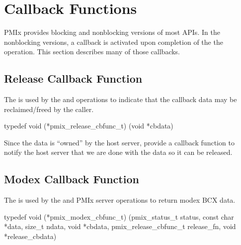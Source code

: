 %


\section{Callback Functions}

PMIx provides blocking and nonblocking versions of most APIs.
In the nonblocking versions, a callback is activated upon completion of the the operation.
This section describes many of those callbacks.


\subsection{Release Callback Function}

\summary

The  is used by the  and  operations to indicate that the callback data may be reclaimed/freed by the caller.

\format

\cspecificstart
\begin{codepar}
typedef void (*pmix_release_cbfunc_t)
    (void *cbdata)
\end{codepar}
\cspecificend

\begin{arglist}
\end{arglist}

\descr

Since the data is ``owned'' by the host server, provide a callback function to notify the host server that we are done with the data so it can be released.


\subsection{Modex Callback Function}

\summary

The  is used by the  and  PMIx server operations to return modex \ac{BCX} data.

\cspecificstart
\begin{codepar}
typedef void (*pmix_modex_cbfunc_t)
    (pmix_status_t status,
     const char *data, size_t ndata,
     void *cbdata,
     pmix_release_cbfunc_t release_fn,
     void *release_cbdata)
\end{codepar}
\cspecificend

